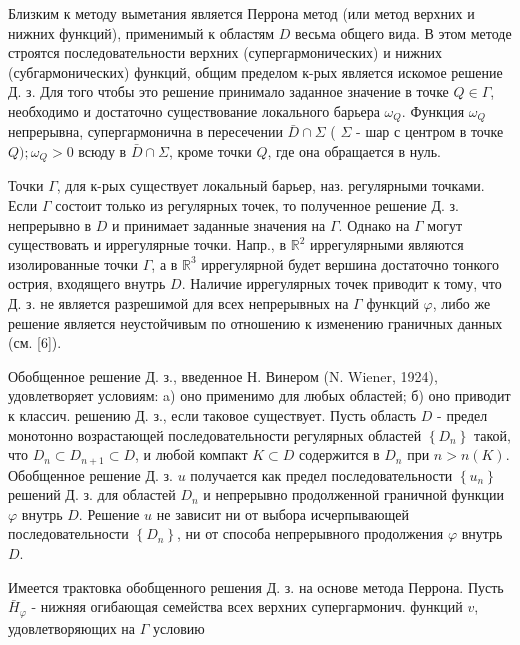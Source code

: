 \documentclass[10pt]{article}
\begin{document}
Близким к методу выметания является Перрона метод (или метод верхних и нижних функций), применимый к областям $D$ весьма общего вида. В этом методе строятся последовательности верхних (супергармонических) и нижних (субгармонических) функций, общим пределом к-рых является искомое решение Д. з. Для того чтобы это решение принимало заданное значение в точке $Q \in \Gamma$, необходимо и достаточно существование локального барьера $\omega_{Q}$. Функция $\omega_{Q}$ непрерывна, супергармонична в пересечении $\bar{D} \cap \Sigma$ ( $\Sigma$ - шар с центром в точке $Q) ; \omega_{Q}>0$ всюду в $\bar{D} \cap \Sigma$, кроме точки $Q$, где она обращается в нуль.



Точки $\Gamma$, для к-рых существует локальный барьер, наз. регулярными точками. Если $\Gamma$ состоит только из регулярных точек, то полученное решение Д. з. непрерывно в $D$ и принимает заданные значения на $\Gamma$. Однако на $\Gamma$ могут существовать и иррегулярные точки. Напр., в $\mathbb{R}^{2}$ иррегулярными являются изолированные точки $\Gamma$, а в $\mathbb{R}^{3}$ иррегулярной будет вершина достаточно тонкого острия, входящего внутрь $D$. Наличие иррегулярных точек приводит к тому, что Д. з. не является разрешимой для всех непрерывных на $\Gamma$ функций $\varphi$, либо же решение является неустойчивым по отношению к изменению граничных данных (см. [6]).



Обобщенное решение Д. з., введенное Н. Винером (N. Wiener, 1924), удовлетворяет условиям: a) оно применимо для любых областей; б) оно приводит к классич. решению Д. з., если таковое существует. Пусть область $D$ - предел монотонно возрастающей последовательности регулярных областей $\left\{D_{n}\right\}$ такой, что $D_{n} \subset D_{n+1} \subset D$, и любой компакт $K \subset D$ содержится в $D_{n}$ при $n>n(K)$. Обобщенное решение Д. з. $u$ получается как предел последовательности $\left\{u_{n}\right\}$ решений Д. з. для областей $D_{n}$ и непрерывно продолженной граничной функции $\varphi$ внутрь $D$. Решение $u$ не зависит ни от выбора исчерпывающей последовательности $\left\{D_{n}\right\}$, ни от способа непрерывного продолжения $\varphi$ внутрь $D$.



Имеется трактовка обобщенного решения Д. з. на основе метода Перрона. Пусть $\bar{H}_{\varphi}$ - нижняя огибающая семейства всех верхних супергармонич. функций $v$, удовлетворяющих на $\Gamma$ условию
\end{document}

